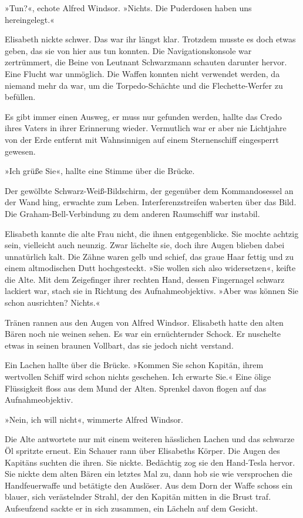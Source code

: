 »Tun?«, echote Alfred Windsor. »Nichts. Die Puderdosen haben uns
hereingelegt.«

Elisabeth nickte schwer. Das war ihr längst klar. Trotzdem musste
es doch etwas geben, das sie von hier aus tun konnten. Die
Navigationskonsole war zertrümmert, die Beine von Leutnant
Schwarzmann schauten darunter hervor. Eine Flucht war unmöglich.
Die Waffen konnten nicht verwendet werden, da niemand mehr da war,
um die Torpedo-Schächte und die Flechette-Werfer zu befüllen.

Es gibt immer einen Ausweg, er muss nur gefunden werden, hallte das
Credo ihres Vaters in ihrer Erinnerung wieder. Vermutlich war er
aber nie Lichtjahre von der Erde entfernt mit Wahnsinnigen auf
einem Sternenschiff eingesperrt gewesen.

\bigpar

»Ich grüße Sie«, hallte eine Stimme über die Brücke.

Der gewölbte Schwarz-Weiß-Bildschirm, der gegenüber dem
Kommandosessel an der Wand hing, erwachte zum Leben.
Interferenzstreifen waberten über das Bild. Die
Graham-Bell-Verbindung zu dem anderen Raumschiff war instabil.

Elisabeth kannte die alte Frau nicht, die ihnen entgegenblicke. Sie
mochte achtzig sein, vielleicht auch neunzig. Zwar lächelte sie,
doch ihre Augen blieben dabei unnatürlich kalt. Die Zähne waren
gelb und schief, das graue Haar fettig und zu einem altmodischen
Dutt hochgesteckt. »Sie wollen sich also widersetzen«, keifte die
Alte. Mit dem Zeigefinger ihrer rechten Hand, dessen Fingernagel
schwarz lackiert war, stach sie in Richtung des Aufnahmeobjektivs.
»Aber was können Sie schon ausrichten? Nichts.«

Tränen rannen aus den Augen von Alfred Windsor. Elisabeth hatte den
alten Bären noch nie weinen sehen. Es war ein ernüchternder Schock.
Er nuschelte etwas in seinen braunen Vollbart, das sie jedoch nicht
verstand.

Ein Lachen hallte über die Brücke. »Kommen Sie schon Kapitän, ihrem
wertvollen Schiff wird schon nichts geschehen. Ich erwarte Sie.«
Eine ölige Flüssigkeit floss aus dem Mund der Alten. Sprenkel davon
flogen auf das Aufnahmeobjektiv.

»Nein, ich will nicht«, wimmerte Alfred Windsor.

Die Alte antwortete nur mit einem weiteren hässlichen Lachen und
das schwarze Öl spritzte erneut. Ein Schauer rann über Elisabeths
Körper. Die Augen des Kapitäns suchten die ihren. Sie nickte.
Bedächtig zog sie den Hand-Tesla hervor. Sie nickte dem alten Bären
ein letztes Mal zu, dann hob sie wie versprochen die Handfeuerwaffe
und betätigte den Auslöser. Aus dem Dorn der Waffe schoss ein
blauer, sich verästelnder Strahl, der den Kapitän mitten in die
Brust traf. Aufseufzend sackte er in sich zusammen, ein Lächeln auf
dem Gesicht.

